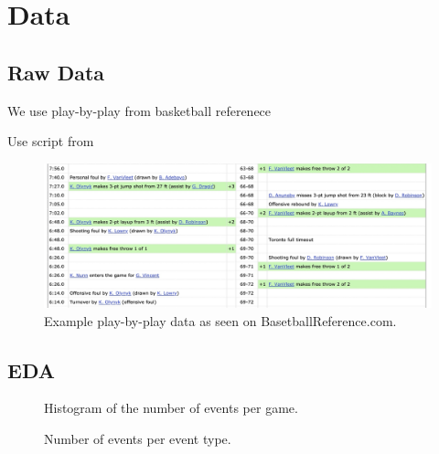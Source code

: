 \section{Data}

\subsection{Raw Data}

We use play-by-play from basketball referenece

Use script from

\begin{figure}
	\includegraphics[width = .8 \textwidth]{figures/bbref-pbp.jpg}
	\caption{Example play-by-play data as seen on BasetballReference.com.}
\end{figure}

\subsection{EDA}

\begin{figure}
	\caption{Histogram of the number of events per game.}
\end{figure}

\begin{figure}
	\caption{Number of events per event type.}
\end{figure}
